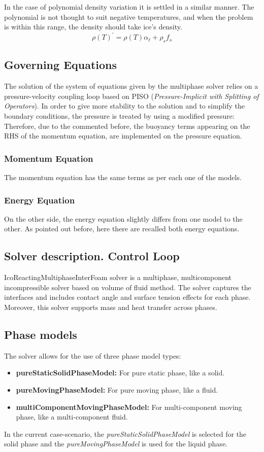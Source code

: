 In the case of polynomial density variation it is settled in a similar manner. The polynomial is not thought to suit negative temperatures, and when the problem is within this range, the density should take ice's density.
\begin{equation}
\rho(T)^{\prime}=\rho(T) \alpha_{\ell}+\rho_{s} f_{s}
\label{3.37}
\end{equation}

\subsection{Governing Equations}
The solution of the system of equations given by the multiphase solver relies on a pressure-velocity coupling loop based on PISO (\textit{Pressure-Implicit with Splitting of Operators}). In order to give more stability to the solution and to simplify the boundary conditions, the pressure is treated by using a modified pressure:
\newline
Therefore, due to the commented before, the buoyancy terms appearing on the RHS of the momentum equation, are implemented on the pressure equation.

\subsubsection{Momentum Equation}
The momentum equation has the same terms as per each one of the models.
\subsubsection{Energy Equation}
On the other side, the energy equation slightly differs from one model to the other. As pointed out before, here there are recalled both energy equations.

\subsection{Solver description. Control Loop}
IcoReactingMultiphaseInterFoam solver is a multiphase, multicomponent incompressible solver based on volume of fluid method. The solver captures the interfaces and includes contact angle and surface tension effects for each phase. Moreover, this solver supports mass and heat transfer across phases.
\subsection{Phase models}
The solver allows for the use of three phase model types:
\begin{itemize}
	\item \textbf{pureStaticSolidPhaseModel:} For pure static phase, like a solid.
	\item \textbf{pureMovingPhaseModel:} For pure moving phase, like a fluid.
	\item \textbf{multiComponentMovingPhaseModel:} For multi-component moving phase, like a multi-component fluid.
\end{itemize}
In the current case-scenario, the \textit{pureStaticSolidPhaseModel} is selected for the solid phase and the \textit{pureMovingPhaseModel} is used for the liquid phase. 
